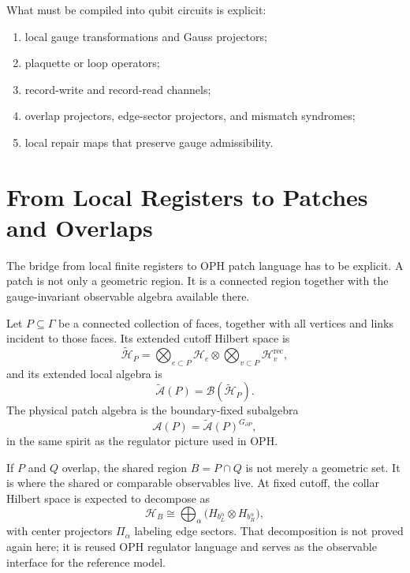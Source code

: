 \documentclass[11pt]{article}
\begin{document}
What must be compiled into qubit circuits is explicit:
\begin{enumerate}[leftmargin=2em]
\item local gauge transformations and Gauss projectors;
\item plaquette or loop operators;
\item record-write and record-read channels;
\item overlap projectors, edge-sector projectors, and mismatch syndromes;
\item local repair maps that preserve gauge admissibility.
\end{enumerate}

\section{From Local Registers to Patches and Overlaps}

The bridge from local finite registers to OPH patch language has to be explicit. A patch is
not only a geometric region. It is a connected region together with the gauge-invariant
observable algebra available there.

Let $P\subseteq \Gamma$ be a connected collection of faces, together with all vertices and
links incident to those faces. Its extended cutoff Hilbert space is
\begin{equation}
\widetilde{\mathcal H}_P=
\bigotimes_{e\subset P}\mathcal H_e
\otimes
\bigotimes_{v\subset P}\mathcal H_v^{\mathrm{rec}},
\end{equation}
and its extended local algebra is
\begin{equation}
\widetilde{\mathcal A}(P)=\mathcal B(\widetilde{\mathcal H}_P).
\end{equation}
The physical patch algebra is the boundary-fixed subalgebra
\begin{equation}
\mathcal A(P)=\widetilde{\mathcal A}(P)^{G_{\partial P}},
\end{equation}
in the same spirit as the regulator picture used in OPH.

If $P$ and $Q$ overlap, the shared region $B=P\cap Q$ is not merely a geometric set. It is
where the shared or comparable observables live. At fixed cutoff, the collar Hilbert space is
expected to decompose as
\begin{equation}
\mathcal H_B \cong \bigoplus_{\alpha}
\bigl(H_{b_L^{\alpha}}\otimes H_{b_R^{\alpha}}\bigr),
\end{equation}
with center projectors $\Pi_{\alpha}$ labeling edge sectors. That decomposition is not proved
again here; it is reused OPH regulator language and serves as the observable interface for the
reference model.
\end{document}
